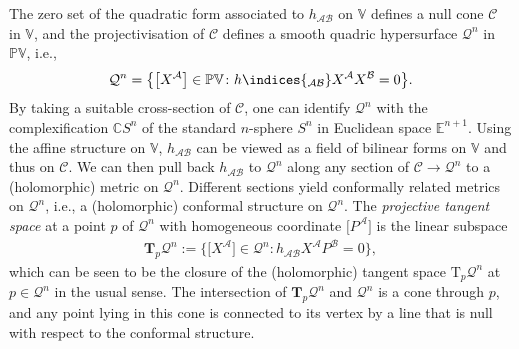 \documentclass[pdftex]{sigma}
\numberwithin{equation}{section}
\newcommand{\mbf} [1]{\mathbf{#1}}
\newcommand{\mc} [1]{\mathcal{#1}}
\newcommand{\ind} {\indices}
\newcommand{\Tgt} {\mathrm{T}}
\newcommand{\Pp} {\mathbb{P}}
\newcommand{\E} {\mathbb{E}}
\newcommand{\C} {\mathbb{C}}
\newcommand{\V} {\mathbb{V}}
\begin{document}
The zero set of the quadratic form associated to $h_{\mc{A} \mc{B}}$ on $\V$ def\/ines a null cone $\mc{C}$ in $\V$, and the projectivisation of $\mc{C}$ def\/ines a smooth quadric hypersurface $\mc{Q}^n$ in $\Pp \V$, i.e.,
\begin{gather*}
\mc{Q}^n = \big\{ \big[X^\mc{A}\big] \in \Pp \V \colon h \ind{_{\mc{A} \mc{B}}} X^\mc{A} X^\mc{B} = 0 \big\} .
\end{gather*}
By taking a suitable cross-section of $\mc{C}$, one can identify $\mc{Q}^n$ with the complexif\/ication $\C S^n$ of the standard $n$-sphere $S^n$ in Euclidean space $\E^{n+1}$. Using the af\/f\/ine structure on $\V$, $h_{\mc{A} \mc{B}}$ can be viewed as a f\/ield of bilinear forms on $\V$ and thus on $\mc{C}$. We can then pull back $h_{\mc{A} \mc{B}}$ to $\mc{Q}^n$ along any section of $\mc{C} \rightarrow \mc{Q}^n$ to a (holomorphic) metric on $\mc{Q}^n$. Dif\/ferent sections yield conformally related metrics on $\mc{Q}^n$, i.e., a (holomorphic) conformal structure on $\mc{Q}^n$. The \emph{projective tangent space} at a point $p$ of $\mc{Q}^n$ with homogeneous coordinate $\big[P^\mc{A}\big]$ is the linear subspace
\begin{gather*}
\mbf{T}_p \mc{Q}^n := \big\{ \big[X^\mc{A}\big] \in \mc{Q}^n \colon h_{\mc{A} \mc{B}} X^\mc{A} P^\mc{B} = 0\big \} ,
\end{gather*}
which can be seen to be the closure of the (holomorphic) tangent space $\Tgt_p \mc{Q}^n$ at $p \in \mc{Q}^n$ in the usual sense. The intersection of $\mbf{T}_p \mc{Q}^n$ and $\mc{Q}^n$ is a cone through $p$, and any point lying in this cone is connected to its vertex by a line that is null with respect to the conformal structure.
\end{document}
